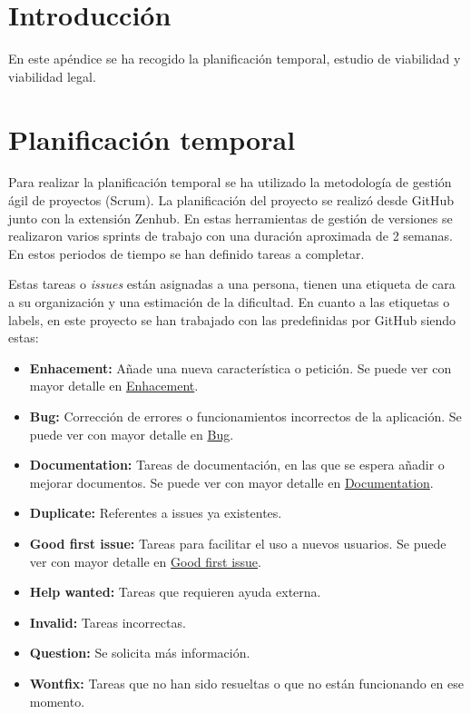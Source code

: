 
\section{Introducción}

En este apéndice se ha recogido la planificación temporal, estudio de viabilidad y viabilidad legal.

\section{Planificación temporal}

Para realizar la planificación temporal se ha utilizado la metodología de gestión ágil de proyectos (Scrum). La planificación del proyecto se realizó desde GitHub junto con la extensión Zenhub. En estas herramientas de gestión de versiones se realizaron varios sprints de trabajo con una duración aproximada de 2 semanas. En estos periodos de tiempo se han definido tareas a completar. 

Estas tareas o \textit{issues} están asignadas a una persona, tienen una etiqueta de cara a su organización y una estimación de la dificultad. En cuanto a las etiquetas o labels, en este proyecto se han trabajado con las predefinidas por GitHub siendo estas:
\begin{itemize}
    \item \textbf{Enhacement:} Añade una nueva característica o petición. Se puede ver con mayor detalle en \href{https://github.com/humbertoms99/Mixing_models/issues?q=label%3Aenhancement+}{Enhacement}.
    \item \textbf{Bug:} Corrección de errores o funcionamientos incorrectos de la aplicación. Se puede ver con mayor detalle en \href{https://github.com/humbertoms99/Mixing_models/issues?q=label%3Abug+}{Bug}.
    \item \textbf{Documentation:} Tareas de documentación, en las que se espera añadir o mejorar documentos. Se puede ver con mayor detalle en \href{https://github.com/humbertoms99/Mixing_models/issues?q=label%3Adocumentation}{Documentation}.  
    \item \textbf{Duplicate:} Referentes a issues ya existentes.
    \item \textbf{Good first issue:} Tareas para facilitar el uso a nuevos usuarios. Se puede ver con mayor detalle en  \href{https://github.com/humbertoms99/Mixing_models/issues?q=label%3A%22good+first+issue%22}{Good first issue}.
    \item \textbf{Help wanted:} Tareas que requieren ayuda externa.
    \item \textbf{Invalid:} Tareas incorrectas.
    \item \textbf{Question:} Se solicita más información.
    \item \textbf{Wontfix:} Tareas que no han sido resueltas o que no están funcionando en ese momento.
\end{itemize}

